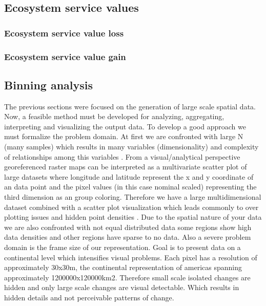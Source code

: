 	\subsection{Ecosystem service values}
		\subsubsection{Ecosystem service value loss}
			\lipsum[1-2]
		\subsubsection{Ecosystem service value gain}
			\lipsum[1]

	\subsection{Binning analysis}
		The previous sections were focused on the generation of large scale spatial data. Now, a feasible method must be developed for analyzing, aggregating, interpreting and visualizing the output data. To develop a good approach we must formalize the problem domain. At first we are confronted with large N (many samples) which results in many variables (dimensionality) and complexity of relationships among this variables \citep{Carr1990}. From a visual/analytical perspective georeferenced raster maps can be interpreted as a multivariate scatter plot of large datasets where longitude and latitude represent the x and y coordinate of an data point and the pixel values (in this case nominal scaled) representing the third dimension as an group coloring. Therefore we have a large multidimensional dataset combined with a scatter plot visualization which leads commonly to over plotting issues and hidden point densities \citep{Carr1987}. Due to the spatial nature of your data we are also confronted with not equal distributed data some regions show high data densities and other regions have sparse to no data. Also a severe problem domain is the frame size of our representation. Goal is to present data on a continental level which intensifies visual problems. Each pixel has a resolution of approximately 30x30m, the continental representation of americas spanning approximately 1200000x120000km2. Therefore small scale isolated changes are hidden and only large scale changes are visual detectable. Which results in hidden details and not perceivable patterns of change.

